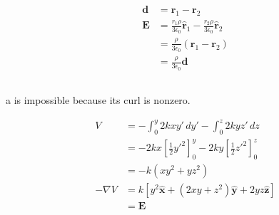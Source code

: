 \documentclass{article}
\renewcommand{\vec}[1]{\boldsymbol{\mathbf{#1}}}
\newcommand{\uvec}[1]{\hat{\vec{#1}}}
\begin{document}
\begin{align*}
  \vec{d} & = \vec{r}_1 - \vec{r}_2                                                               \\
  \vec{E} & = \frac{r_1 \rho}{3 \epsilon_0} \uvec{r}_1 - \frac{r_2 \rho}{3 \epsilon_0} \uvec{r}_2 \\
          & = \frac{\rho}{3 \epsilon_0} (\vec{r}_1 - \vec{r}_2)                                   \\
          & = \frac{\rho}{3 \epsilon_0} \vec{d}
\end{align*}

\setcounter{subsection}{19}
\subsection{}

a is impossible because its curl is nonzero.

\begin{align*}
  V         & = -\int_0^y 2 k x y' \,d y' - \int_0^z 2 k y z' \,d z                                    \\
            & = -2 k x \left[ \frac{1}{2} y'^2 \right]_0^y - 2 k y \left[ \frac{1}{2} z'^2 \right]_0^z \\
            & = -k (x y^2 + y z^2)                                                                     \\
  -\nabla V & = k [y^2 \uvec{x} + (2 x y + z^2) \uvec{y} + 2 y z \uvec{z}]                             \\
            & = \vec{E}
\end{align*}

\subsection{}
\end{document}

